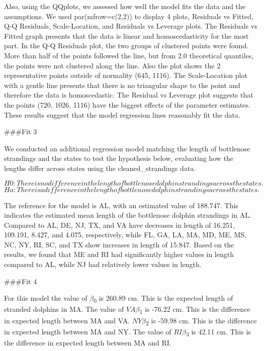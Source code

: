 \documentclass[
]{article}
\begin{document}
Also, using the QQplots, we assessed how well the model fits the data
and the assumptions. We used par(mfrow=c(2,2)) to display 4 plots,
Residuals vs Fitted, Q-Q Residuals, Scale-Location, and Residuals vs
Leverage plots. The Residuals vs Fitted graph presents that the data is
linear and homoscedasticity for the most part. In the Q-Q Residuals
plot, the two groups of clustered points were found. More than half of
the points followed the line, but from 2.0 theoretical quantiles, the
points were not clustered along the line. Also the plot shows the 2
representative points outside of normality (645, 1116). The
Scale-Location plot with a gentle line presents that there is no
triangular shape to the point and therefore the data is homoscedastic.
The Residual vs Leverage plot suggests that the points (720, 1026, 1116)
have the biggest effects of the parameter estimates. These results
suggest that the model regression lines reasonably fit the data.

\#\#\#Fit 3

We conducted an additional regression model matching the length of
bottlenose strandings and the states to test the hypothesis below,
evaluating how the lengths differ across states using the
cleaned\_strandings data.

\[H0: There is no difference in the length of bottlenose dolphin strandings across the states.\]
\[Ha: There is a difference in the length of bottlenose dolphin strandings across the states.\]

The reference for the model is AL, with an estimated value of 188.747.
This indicates the estimated mean length of the bottlenose dolphin
strandings in AL. Compared to AL, DE, NJ, TX, and VA have decreases in
length of 16.251, 109.191, 8.427, and 4.075, respectively, while FL, GA,
LA, MA, MD, ME, MS, NC, NY, RI, SC, and TX show increases in length of
15.847. Based on the results, we found that ME and RI had significantly
higher values in length compared to AL, while NJ had relatively lower
values in length.

\#\#\#Fit 4

For this model the value of \(\beta\)\textsubscript{0} is 260.89 cm.
This is the expected length of stranded dolphins in MA. The value of
\(VA\beta\)\textsubscript{1} is -76.22 cm. This is the difference in
expected length between MA and VA. \(NY\beta\)\textsubscript{2} is
-59.98 cm. This is the difference in expected length between MA and NY.
The value of \(RI\beta\)\textsubscript{3} is 42.11 cm. This is the
difference in expected length between MA and RI.
\end{document}
